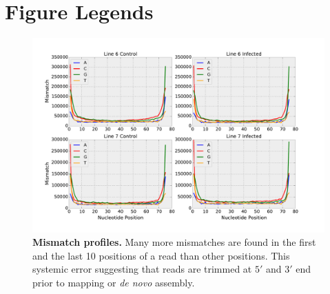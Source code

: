 \documentclass[10pt]{article}
\begin{document}



%

\section*{Figure Legends}
\begin{figure}[!ht]
\begin{center}
\includegraphics[width=6in]{error_profile.pdf}
\end{center}
\caption{
{\bf Mismatch profiles.} Many more mismatches are found in the first and the
last 10 positions of a read than other positions.
This systemic error suggesting that reads are trimmed at $5'$ and $3'$ end
prior to mapping or \emph{de novo} assembly.
}
\label{Figure_label}
\end{figure}
\end{document}
